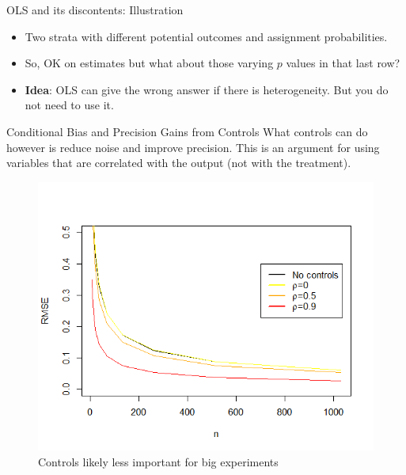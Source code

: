 \documentclass[
  11pt,
  ignorenonframetext,
]{beamer}
\begin{document}
\begin{frame}{OLS and its discontents: Illustration}
\protect\hypertarget{ols-and-its-discontents-illustration-3}{}
\begin{itemize}
\item
  Two strata with different potential outcomes and assignment
  probabilities.
\item
  So, OK on estimates but what about those varying \(p\) values in that
  last row?
\item
  \textbf{Idea}: OLS can give the wrong answer if there is
  heterogeneity. But you do not need to use it.
\end{itemize}
\end{frame}

\begin{frame}{Conditional Bias and Precision Gains from Controls}
\protect\hypertarget{conditional-bias-and-precision-gains-from-controls}{}
\small What controls can do however is reduce noise and improve
precision. This is an argument for using variables that are correlated
with the output (not with the treatment).

\begin{figure}
\centering
\includegraphics[width=0.65\linewidth]{figs/n}
\caption{Controls likely less important for big experiments}
\label{fig:n}
\end{figure}
\end{frame}
\end{document}
